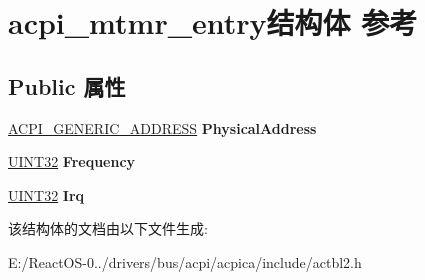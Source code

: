 \hypertarget{structacpi__mtmr__entry}{}\section{acpi\+\_\+mtmr\+\_\+entry结构体 参考}
\label{structacpi__mtmr__entry}
\subsection*{Public 属性}
\begin{DoxyCompactItemize}
\item 
\mbox{\label{structacpi__mtmr__entry_a77fe3176b99b26b88542e8a1f392205c}} 
\hyperlink{structacpi__generic__address}{A\+C\+P\+I\+\_\+\+G\+E\+N\+E\+R\+I\+C\+\_\+\+A\+D\+D\+R\+E\+SS} {\bfseries Physical\+Address}
\item 
\mbox{\label{structacpi__mtmr__entry_ad544de268283e76552d1f01943b15886}} 
\hyperlink{_processor_bind_8h_ae1e6edbbc26d6fbc71a90190d0266018}{U\+I\+N\+T32} {\bfseries Frequency}
\item 
\mbox{\label{structacpi__mtmr__entry_ae15ac9aa354a205d537d76ff2ac95442}} 
\hyperlink{_processor_bind_8h_ae1e6edbbc26d6fbc71a90190d0266018}{U\+I\+N\+T32} {\bfseries Irq}
\end{DoxyCompactItemize}


该结构体的文档由以下文件生成\+:\begin{DoxyCompactItemize}
\item 
E\+:/\+React\+O\+S-\/0../drivers/bus/acpi/acpica/include/actbl2.\+h\end{DoxyCompactItemize}
